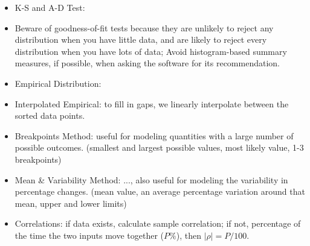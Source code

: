 \documentclass[10pt, twocolumn]{article}
\begin{document}
\begin{itemize}
\item K-S and A-D Test: 
\item Beware of goodness-of-fit tests because they are unlikely to reject any distribution when you have little data, and are likely to reject every distribution when you have lots of data; Avoid histogram-based summary measures, if possible, when asking the software for its recommendation.
\item Empirical Distribution: 
\item Interpolated Empirical: to fill in gaps, we linearly interpolate between the sorted data points. 
\item Breakpoints Method: useful for modeling quantities with a large number of possible outcomes. (smallest and largest possible values, most likely value, 1-3 breakpoints)
\item Mean \& Variability Method: ..., also useful for modeling the variability in percentage changes. (mean value, an average percentage variation around that mean, upper and lower limits)
\item Correlations: if data exists, calculate sample correlation; if not, percentage of the time the two inputs move together ($P\%$), then $|\rho|=P/100$.
\end{itemize}
\end{document}
